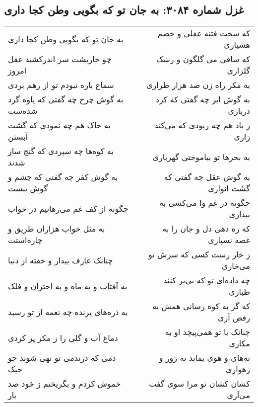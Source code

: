 \begin{center}
\section*{غزل شماره ۳۰۸۴: به جان تو که بگویی وطن کجا داری}
\label{sec:3084}
\begin{longtable}{l p{0.5cm} r}
به جان تو که بگویی وطن کجا داری
&&
که سخت فتنه عقلی و خصم هشیاری
\\
چو خارپشت سر اندرکشید عقل امروز
&&
که ساقی می گلگون و رشک گلزاری
\\
سماع باره نبودم تو از رهم بردی
&&
به مکر راه زن صد هزار طراری
\\
به گوش چرخ چه گفتی که یاوه گرد شده‌ست
&&
به گوش ابر چه گفتی که کرد درباری
\\
به خاک هم چه نمودی که گشت آبستن
&&
ز باد هم چه ربودی که می‌کند زاری
\\
به کوه‌ها چه سپردی که گنج ساز شدند
&&
به بحرها تو بیاموختی گهرباری
\\
به گوش کفر چه گفتی که چشم و گوش ببست
&&
به گوش عقل چه گفتی که گشت انواری
\\
چگونه از کف غم می‌رهانیم در خواب
&&
چگونه در غم وا می‌کشی به بیداری
\\
به مثل خواب هزاران طریق و چاره‌استت
&&
که ره دهی دل و جان را به غصه نسپاری
\\
چنانک عارف بیدار و خفته از دنیا
&&
ز خار رست کسی که سرش تو می‌خاری
\\
به آفتاب و به ماه و به اختران و فلک
&&
چه داده‌ای تو که بی‌پر کنند طیاری
\\
به ذره‌های پرنده چه نغمه از تو رسید
&&
که گر به کوه رسانی همش به رقص آری
\\
دماغ آب و گلی را ز مکر پر کردی
&&
چنانک با تو همی‌پیچد او به مکاری
\\
دمی که درندمی تو تهی شوند چو خیک
&&
نه‌های و هوی بماند نه زور و رهواری
\\
خموش کردم و بگریختم ز خود صد بار
&&
کشان کشان تو مرا سوی گفت می‌آری
\\
\end{longtable}
\end{center}
